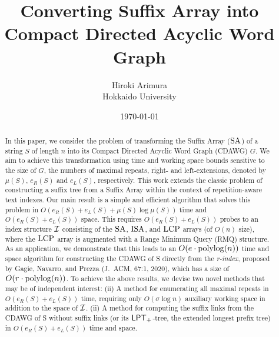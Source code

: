 \documentclass{article}
\title{
Converting Suffix Array into Compact Directed Acyclic Word Graph
}
\author{Hiroki Arimura\\
Hokkaido University
}
\date{\today}
\begin{document}
\maketitle

\begin{abstract}
In this paper, we consider the problem of transforming the Suffix Array ($\mathrm{SA}$) of a string $S$ of length $n$ into its Compact Directed Acyclic Word Graph (CDAWG) $G$. We aim to achieve this transformation using time and working space bounds sensitive to the size of $G$, the numbers of maximal repeats, right- and left-extensions, denoted by $\mu(S)$, $e_R(S)$ and $e_L(S)$, respectively. This work extends the classic problem of constructing a suffix tree from a Suffix Array within the context of repetition-aware text indexes.
Our main result is a simple and efficient algorithm that solves this problem in $O(e_R(S) + e_L(S) + \mu(S)\log \mu(S))$ time and
$O(e_R(S) + e_L(S))$ space. This requires $O(e_R(S) + e_L(S))$ probes to an index structure $\mathcal{I}$ consisting of the $\mathrm{SA}$, $\mathrm{ISA}$, and $\mathrm{LCP}$ arrays (of $O(n)$ size), where the $\mathrm{LCP}$ array is augmented with a Range Minimum Query (RMQ) structure.
As an application, we demonstrate that this leads to an $O(e\cdot\operatorname{\mathrm{polylog}}(n))$ time and space algorithm for constructing the CDAWG of S directly from the \textit{r-index}, proposed by Gagie, Navarro, and Prezza (J.~ACM, 67:1, 2020), which has a size of $O(r\cdot\operatorname{\mathrm{polylog}}(n))$.
To achieve the above results, we devise two novel methods that may be of independent interest:
(ii) A method for enumerating all maximal repeats in $O(e_R(S) + e_L(S))$ time, requiring only $O(\sigma \log n)$ auxiliary working space in addition to the space of $\mathcal{I}$. 
(ii) A method for computing the suffix links from the CDAWG of S without suffix links (or its $\mathsf{LPT}_{+}$-tree, the extended longest prefix tree) in $O(e_R(S) + e_L(S))$ time and space.

\end{abstract}
\end{document}
